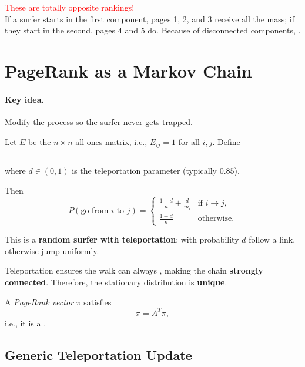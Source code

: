 \documentclass[11pt]{exam}
\begin{document}
\vspace{0.2cm}
\textcolor{red}{These are totally opposite rankings!} \\

If a surfer starts in the first component, pages 1, 2, and 3 receive all the mass; 
if they start in the second, pages 4 and 5 do. 
Because of disconnected components, .

\newpage
\section{PageRank as a Markov Chain}

\paragraph{Key idea.}
Modify the process so the surfer never gets trapped.

\vspace{0.5em}
Let $E$ be the $n \times n$ all-ones matrix, i.e., $E_{ij} = 1$ for all $i,j$.  
Define
\[
\phantom{
A = \frac{1-d}{n}E + d L M^{-1},}
\]
where $d \in (0,1)$ is the teleportation parameter (typically $0.85$).

Then
\[
P(\text{go from } i \text{ to } j) =
\begin{cases}
\frac{1-d}{n} + \frac{d}{m_i} & \text{if } i \to j, \\
\frac{1-d}{n} & \text{otherwise}.
\end{cases}
\]

\vspace{0.5em}

This is a \textbf{random surfer with teleportation}: with probability $d$ follow a link, otherwise jump uniformly.

\vspace{0.5em}

Teleportation ensures the walk can always , making the chain \textbf{strongly connected}.  
Therefore, the stationary distribution is \textbf{unique}.

\vspace{0.5em}

A \emph{PageRank vector} $\pi$ satisfies
\[
\pi = A^T \pi,
\]
i.e., it is a .

\newpage
\subsection{Generic Teleportation Update}
\end{document}
